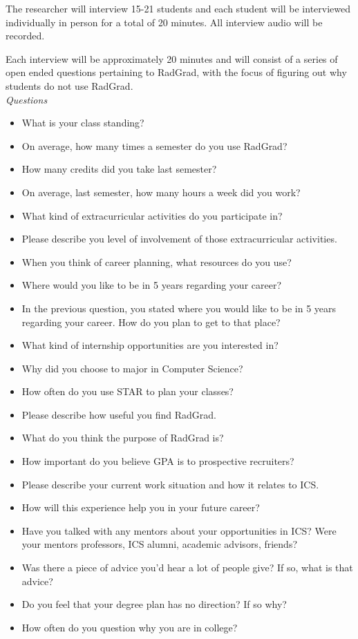 \documentclass[english]{proposalnsf}
\begin{document}
The researcher will interview 15-21 students and each student will be interviewed individually in person for a total of 20 minutes. All interview audio will be recorded. 
 
Each interview will be approximately 20 minutes and will consist of a series of open ended questions pertaining to RadGrad, with the focus of figuring out why students do not use RadGrad.\\ 

{\em Questions}

\begin{itemize}
	\item What is your class standing?
	\item On average, how many times a semester do you use RadGrad?
	\item How many credits did you take last semester?
	\item On average, last semester, how many hours a week did you work?	
	\item What kind of extracurricular activities do you participate in?
	\item Please describe you level of involvement of those extracurricular activities.
	\item When you think of career planning, what resources do you use?
	\item Where would you like to be in 5 years regarding your career?
	\item In the previous question, you stated where you would like to be in 5 years regarding your career. How do you plan to get to that place?
	\item What kind of internship opportunities are you interested in?
	\item Why did you choose to major in Computer Science?
	\item How often do you use STAR to plan your classes?
	\item Please describe how useful you find RadGrad.
	\item What do you think the purpose of RadGrad is?
	\item How important do you believe GPA is to prospective recruiters?
	\item Please describe your current work situation and how it relates to ICS.
	\item How will this experience help you in your future career?
	\item Have you talked with any mentors about your opportunities in ICS? Were your mentors professors, ICS alumni, academic advisors, friends?
	\item Was there a piece of advice you'd hear a lot of people give? If so, what is that advice?
	\item Do you feel that your degree plan has no direction? If so why?
	\item How often do you question why you are in college?

\end{itemize} 
 
\end{document}
